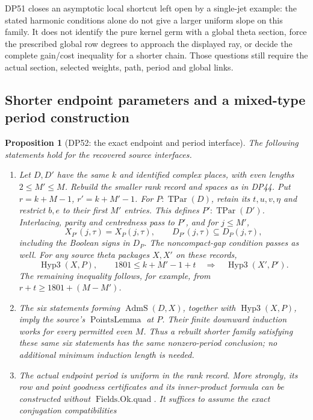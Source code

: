\documentclass[11pt,a4paper]{article}
\newtheorem{proposition}[theorem]{Proposition}
\theoremstyle{definition}\newtheorem{remark}[theorem]{Remark}
\begin{document}
DP51 closes an asymptotic local shortcut left open by a single-jet example:
the stated harmonic conditions alone do not give a larger uniform slope on this family.
It does not identify the pure kernel germ with a global theta section, force the prescribed global row degrees to approach the displayed ray, or decide the complete gain/cost inequality for a shorter chain.
Those questions still require the actual section, selected weights, path, period and global links.


\subsection{Shorter endpoint parameters and a mixed-type period construction}

\begin{proposition}[DP52: the exact endpoint and period interface]\label{DP52}
The following statements hold for the recovered source interfaces.
\begin{enumerate}[label=(\alph*),leftmargin=*]
\item Let $D,D'$ have the same $k$ and identified complex places, with even lengths
$2\le M'\le M$. Rebuild the smaller rank record and spaces as in DP44.
Put $r=k+M-1$, $r'=k+M'-1$.
For $P:\operatorname{TPar}(D)$, retain its $t,u,v,\eta$ and restrict $b,e$ to
their first $M'$ entries. This defines $P':\operatorname{TPar}(D')$.
Interlacing, parity and centredness pass to $P'$, and for $j\le M'$,
\[
 X_{P'}(j,\tau)=X_P(j,\tau),\qquad
 D_{P'}(j,\tau)\subseteq D_P(j,\tau),
\]
including the Boolean signs in $D_P$.
The noncompact-gap condition passes as well.
For any source theta packages $X,X'$ on these records,
\[
 \operatorname{Hyp3}(X,P),\qquad 1801\le k+M'-1+t
 \quad\Longrightarrow\quad \operatorname{Hyp3}(X',P').
\]
The remaining inequality follows, for example, from
$r+t\ge1801+(M-M')$.
\item The six statements forming $\operatorname{AdmS}(D,X)$, together with
$\operatorname{Hyp3}(X,P)$, imply the source's $\operatorname{PointsLemma}$
at $P$. Their finite downward induction works for every permitted even $M$.
Thus a rebuilt shorter family satisfying these same six statements has the
same nonzero-period conclusion; no additional minimum induction length is
needed.
\item The actual endpoint period is uniform in the rank record.
More strongly, its row and point goodness certificates and its inner-product
formula can be constructed without $\operatorname{Fields.Ok.quad}$.
It suffices to assume the exact conjugation compatibilities

\end{enumerate}
\end{proposition}
\end{document}
